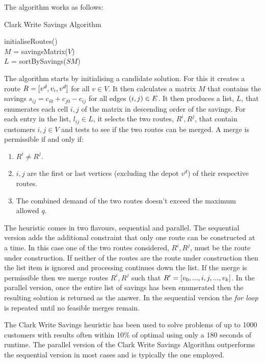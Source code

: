The algorithm works as follows:

\begin{algorithm}[H]
   \caption{Clark Write Savings Algorithm}
   initialiseRoutes()\\
   $M$ = savingsMatrix($V$)\\
   $L$ = sortBySavings($SM$)\\
\end{algorithm}

The algorithm starts by initialising a candidate solution. For this it creates a route $R = [v^d, v_i, v^d]$ for all $v \in V$. It then calculates a matrix $M$ that contains the savings $s_{ij} = c_{i0} + c_{j0} - c_{ij}$ for all edges $(i,j) \in E$. It then produces a list, $L$, that enumerates each cell $i,j$ of the matrix in descending order of the savings. For each entry in the list, $l_{ij} \in L$, it selects the two routes, $R^i, R^j$, that contain customers $i,j \in V$ and tests to see if the two routes can be merged. A merge is permissible if and only if:

\begin{enumerate}
   \item $R^i \neq R^j$.
   \item $i,j$ are the first or last vertices (excluding the depot $v^d$) of their respective routes.
   \item The combined demand of the two routes doesn't exceed the maximum allowed $q$.
\end{enumerate}

The heuristic comes in two flavours, sequential and parallel. The sequential version adds the additional constraint that only one route can be constructed at a time. In this case one of the two routes considered, $R^i, R^j$, must be the route under construction. If neither of the routes are the route under construction then the list item is ignored and processing continues down the list. If the merge is permissible then we merge routes $R^i, R^j$ such that $R' = [v_0,...,i,j,...,v_k]$. In the parallel version, once the entire list of savings has been enumerated then the resulting solution is returned as the answer. In the sequential version the \emph{for loop} is repeated until no feasible merges remain.

The Clark Write Savings heuristic has been used to solve problems of up to 1000 customers with results often within 10\% of optimal using only a 180 seconds of runtime\cite{TV2001}. The parallel version of the Clark Write Savings Algorithm outperforms the sequential version in most cases\cite{Laporte:1999} and is typically the one employed.

